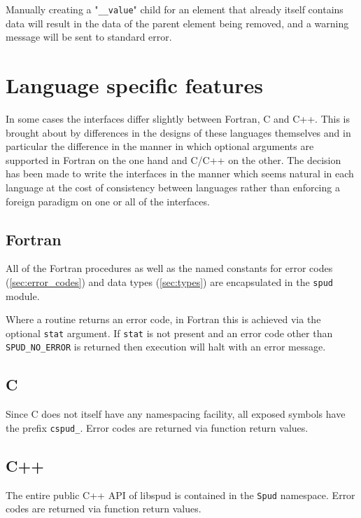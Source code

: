 \documentclass[a4paper, 11pt]{book}
\newcommand{\stat}{\lstinline[language=fortran]+stat+\xspace}
\begin{document}
Manually creating a "\verb+__value+" child for an element that already itself
contains data will result in the data of the parent element being removed, and
a warning message will be sent to standard error.


\section{Language specific features}

In some cases the interfaces differ slightly between Fortran, C and C++.
This is brought about by differences in the designs of these languages
themselves and in particular the difference in the manner in which optional
arguments are supported in Fortran on the one hand and C/C++ on the other.
The decision has been made to write the interfaces in the manner which seems
natural in each language at the cost of consistency between languages rather
than enforcing a foreign paradigm on one or all of the interfaces.

\subsection{Fortran}

All of the Fortran procedures as well as the named constants for error codes
(\ref{sec:error_codes}) and data types
(\ref{sec:types})  are encapsulated in the \lstinline+spud+ module.

Where a routine returns an error code, in Fortran this is achieved via the
optional \stat argument. If \stat is not present and an error code other
than \lstinline[language=fortran]+SPUD_NO_ERROR+ is returned then execution
will halt with an error message.

\subsection{C}

Since C does not itself have any namespacing facility, all exposed symbols
have the prefix \lstinline[language=C]+cspud_+. Error codes are returned via
function return values.

\subsection{C++}

The entire public C++ API of libspud is contained in the
\lstinline[language=C++]+Spud+ namespace. Error codes are returned via function
return values.
\end{document}
